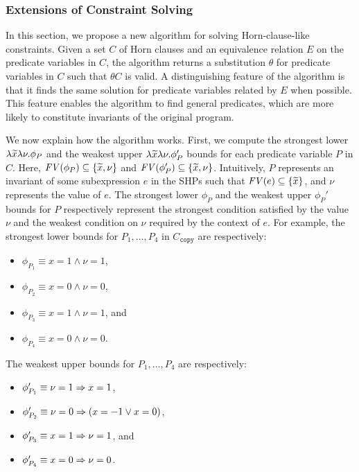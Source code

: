 \subsubsection{Extensions of Constraint Solving}
\label{sec:extcg}


In this section, we propose a new algorithm for solving Horn-clause-like
constraints.  Given a set \(C\) of Horn clauses and an equivalence
relation \(E\) on the predicate variables in \(C\), the algorithm
returns a substitution \(\theta\) for predicate variables in \(C\) such
that \(\theta C\) is valid.  A distinguishing feature of the algorithm
is that it finds the same solution for predicate variables related by
\(E\) when possible.  This feature enables the algorithm to find general
predicates, which are more likely to constitute invariants of the
original program.

We now explain how the algorithm works.  First, we compute the strongest
lower \(\lambda \widetilde{x}\lambda \nu.\phi_P\) and the weakest upper
\(\lambda \widetilde{x}\lambda \nu.\phi_P'\) bounds for each predicate
variable \(P\) in \(C\).  Here, \(\mathit{FV}({\phi_P}) \subseteq
\{{\widetilde{x},\nu}\}\) and \(\mathit{FV}({\phi_P'}) \subseteq \{{\widetilde{x},\nu}\}\).
Intuitively, \(P\) represents an invariant of some subexpression \(e\)
in the SHPs such that \(\mathit{FV}({e}) \subseteq \{{\widetilde{x}}\}\), and \(\nu\)
represents the value of \(e\).  The strongest lower \(\phi_P\) and the
weakest upper \(\phi_{P}'\) bounds for \(P\) respectively represent the
strongest condition satisfied by the value \(\nu\) and the weakest
condition on \(\nu\) required by the context of \(e\).  For example, the
strongest lower bounds for \(P_1,\dots,P_4\) in \(C_{\texttt{copy}}\)
are respectively:
\begin{itemize}
\item \(\phi_{P_1}\equiv x=1 \land \nu=1\),
\item \(\phi_{P_2}\equiv x=0 \land \nu=0\),
\item \(\phi_{P_3}\equiv x=1 \land \nu=1\), and
\item \(\phi_{P_4}\equiv x=0 \land \nu=0\).
\end{itemize}
The weakest upper bounds for \(P_1,\dots,P_4\) are respectively:
\begin{itemize}
\item \(\phi_{P_1}'\equiv \nu=1 \Rightarrow x=1\),
\item \(\phi_{P_2}'\equiv \nu=0 \Rightarrow (x=-1 \lor x=0)\),
\item \(\phi_{P_3}'\equiv x=1 \Rightarrow \nu=1\), and
\item \(\phi_{P_4}'\equiv x=0 \Rightarrow \nu=0\).
\end{itemize}

